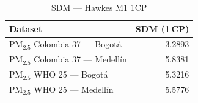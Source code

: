 \begin{table}[htbp]
\centering
\caption{SDM --- Hawkes M1 1CP}
\label{tab:hawkes_sdm_1cp}
\begin{tabular}{lr}
\toprule
Dataset & SDM (1\,CP) \\
\midrule
PM$_{2.5}$ Colombia 37 --- Bogot\'{a} & 3.2893 \\
PM$_{2.5}$ Colombia 37 --- Medell\'{i}n & 5.8381 \\
PM$_{2.5}$ WHO 25 --- Bogot\'{a} & 5.3216 \\
PM$_{2.5}$ WHO 25 --- Medell\'{i}n & 5.5776 \\
\bottomrule
\end{tabular}
\end{table}
